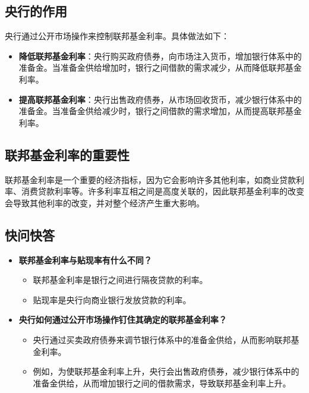 \documentclass[12pt, a4paper]{article}
\begin{document}
\subsection*{央行的作用}
央行通过公开市场操作来控制联邦基金利率。具体做法如下：
\begin{itemize}
    \item \textbf{降低联邦基金利率}：央行购买政府债券，向市场注入货币，增加银行体系中的准备金。当准备金供给增加时，银行之间借款的需求减少，从而降低联邦基金利率。
    \item \textbf{提高联邦基金利率}：央行出售政府债券，从市场回收货币，减少银行体系中的准备金。当准备金供给减少时，银行之间借款的需求增加，从而提高联邦基金利率。
\end{itemize}

\subsection*{联邦基金利率的重要性}
联邦基金利率是一个重要的经济指标，因为它会影响许多其他利率，如商业贷款利率、消费贷款利率等。许多利率互相之间是高度关联的，因此联邦基金利率的改变会导致其他利率的改变，并对整个经济产生重大影响。

\subsection*{快问快答}
\begin{itemize}
    \item \textbf{联邦基金利率与贴现率有什么不同？}
    \begin{itemize}
        \item 联邦基金利率是银行之间进行隔夜贷款的利率。
        \item 贴现率是央行向商业银行发放贷款的利率。
    \end{itemize}
    \item \textbf{央行如何通过公开市场操作钉住其确定的联邦基金利率？}
    \begin{itemize}
        \item 央行通过买卖政府债券来调节银行体系中的准备金供给，从而影响联邦基金利率。
        \item 例如，为使联邦基金利率上升，央行会出售政府债券，减少银行体系中的准备金供给，从而增加银行之间的借款需求，导致联邦基金利率上升。
    \end{itemize}
\end{itemize}
\end{document}
